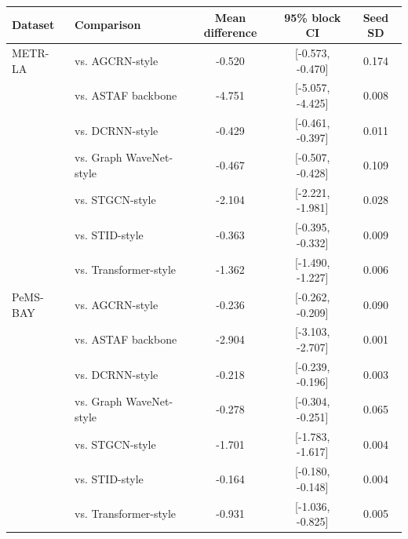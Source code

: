 \begin{tabular}{llccc}
\toprule
Dataset & Comparison & Mean difference & 95\% block CI & Seed SD\\
\midrule
METR-LA & vs. AGCRN-style & -0.520 & [-0.573, -0.470] & 0.174\\
 & vs. ASTAF backbone & -4.751 & [-5.057, -4.425] & 0.008\\
 & vs. DCRNN-style & -0.429 & [-0.461, -0.397] & 0.011\\
 & vs. Graph WaveNet-style & -0.467 & [-0.507, -0.428] & 0.109\\
 & vs. STGCN-style & -2.104 & [-2.221, -1.981] & 0.028\\
 & vs. STID-style & -0.363 & [-0.395, -0.332] & 0.009\\
 & vs. Transformer-style & -1.362 & [-1.490, -1.227] & 0.006\\
\midrule
PeMS-BAY & vs. AGCRN-style & -0.236 & [-0.262, -0.209] & 0.090\\
 & vs. ASTAF backbone & -2.904 & [-3.103, -2.707] & 0.001\\
 & vs. DCRNN-style & -0.218 & [-0.239, -0.196] & 0.003\\
 & vs. Graph WaveNet-style & -0.278 & [-0.304, -0.251] & 0.065\\
 & vs. STGCN-style & -1.701 & [-1.783, -1.617] & 0.004\\
 & vs. STID-style & -0.164 & [-0.180, -0.148] & 0.004\\
 & vs. Transformer-style & -0.931 & [-1.036, -0.825] & 0.005\\
\bottomrule
\end{tabular}